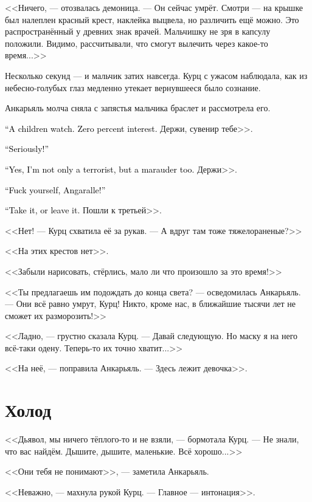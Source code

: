 \documentclass[a4paper,10pt,fleqn]{book}\usepackage{polyglossia}\setdefaultlanguage{english}\setotherlanguage{russian}\defaultfontfeatures{Ligatures=TeX,Mapping=tex-text}\usepackage{xcolor}\definecolor{lightgray}{HTML}{bbbbbb}\color{lightgray}\newcommand{\ml}[3]{\textcolor{black}{#3}}
\begin{document}
<<Ничего, --- отозвалась демоница.
--- Он сейчас умрёт.
Смотри --- на крышке был налеплен красный крест, наклейка выцвела, но различить ещё можно.
Это распространённый у древних знак врачей.
Мальчишку не зря в капсулу положили.
Видимо, рассчитывали, что смогут вылечить через какое-то время...>>

Несколько секунд --- и мальчик затих навсегда.
Курц с ужасом наблюдала, как из небесно-голубых глаз медленно утекает вернувшееся было сознание.

Анкарьяль молча сняла с запястья мальчика браслет и рассмотрела его.

\ml{$0$}
{<<Детские часики.}
{``A children watch.}
\ml{$0$}
{Ничего интересного.}
{Zero percent interest.}
Держи, сувенир тебе>>.

\ml{$0$}
{<<Ты серьёзно?!>>}
{``Seriously!''}

\ml{$0$}
{<<Да, я не только террористка, но ещё и мародёрка.}
{``Yes, I'm not only a terrorist, but a marauder too.}
Держи>>.

\ml{$0$}
{<<Иди ты к дьяволу, Анкарьяль!>>}
{``Fuck yourself, Angaralle!''}

\ml{$0$}
{<<Не хочешь --- не надо.}
{``Take it, or leave it.}
Пошли к третьей>>.

<<Нет! --- Курц схватила её за рукав.
--- А вдруг там тоже тяжелораненые?>>

<<На этих крестов нет>>.

<<Забыли нарисовать, стёрлись, мало ли что произошло за это время!>>

<<Ты предлагаешь им подождать до конца света? --- осведомилась Анкарьяль.
--- Они всё равно умрут, Курц!
Никто, кроме нас, в ближайшие тысячи лет не сможет их разморозить!>>

<<Ладно, --- грустно сказала Курц.
--- Давай следующую.
Но маску я на него всё-таки одену.
Теперь-то их точно хватит...>>

<<На неё, --- поправила Анкарьяль.
--- Здесь лежит девочка>>.

\section{Холод}

<<Дьявол, мы ничего тёплого-то и не взяли, --- бормотала Курц.
--- Не знали, что вас найдём.
Дышите, дышите, маленькие.
Всё хорошо...>>

<<Они тебя не понимают>>, --- заметила Анкарьяль.

<<Неважно, --- махнула рукой Курц.
--- Главное --- интонация>>.
\end{document}
